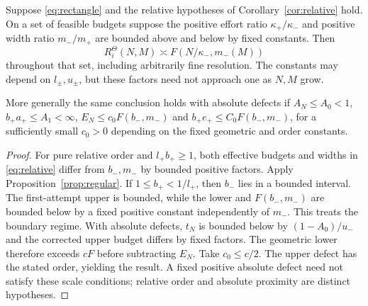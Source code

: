 \begin{corollary}\label{cor:uniform}
Suppose \eqref{eq:rectangle} and the relative hypotheses of Corollary~\ref{cor:relative} hold. On a set of feasible budgets suppose the positive effort ratio $\kappa_+/\kappa_-$ and positive width ratio $m_-/m_+$ are bounded above and below by fixed constants. Then
\begin{equation}\label{eq:uniform-law}
 R_i^\Theta(N,M)\asymp
 F(N/\kappa_-,m_-(M))
\end{equation}
throughout that set, including arbitrarily fine resolution. The constants may depend on $l_\pm,u_\pm$, but these factors need not approach one as $N,M$ grow.

More generally the same conclusion holds with absolute defects if $A_N\le A_0<1$, $b_+a_+\le A_1<\infty$, $E_N\le c_0F(b_-,m_-)$ and $b_+e_+\le C_0F(b_-,m_-)$, for a sufficiently small $c_0>0$ depending on the fixed geometric and order constants.
\end{corollary}
\begin{proof}
For pure relative order and $l_+b_+\ge1$, both effective budgets and widths in \eqref{eq:relative} differ from $b_-,m_-$ by bounded positive factors. Apply Proposition~\ref{prop:regular}. If $1\le b_+<1/l_+$, then $b_-$ lies in a bounded interval. The first-attempt upper is bounded, while the lower and $F(b_-,m_-)$ are bounded below by a fixed positive constant independently of $m_-$. This treats the boundary regime. With absolute defects, $t_N$ is bounded below by $(1-A_0)/u_-$ and the corrected upper budget differs by fixed factors. The geometric lower therefore exceeds $cF$ before subtracting $E_N$. Take $c_0\le c/2$. The upper defect has the stated order, yielding the result. A fixed positive absolute defect need not satisfy these scale conditions; relative order and absolute proximity are distinct hypotheses.
\end{proof}

